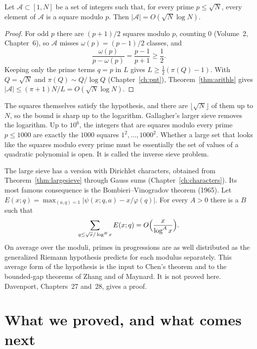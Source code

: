 \begin{proposition}\label{prop:squares}
Let $\mathcal A\subset[1,N]$ be a set of integers such that, for every prime $p\le\sqrt N$, every element of $\mathcal A$ is a square modulo $p$. Then $|\mathcal A|=O(\sqrt N\log N)$.
\end{proposition}
\begin{proof}
For odd $p$ there are $(p+1)/2$ squares modulo $p$, counting $0$ (Volume~2, Chapter~6), so $\mathcal A$ misses $\omega(p)=(p-1)/2$ classes, and
\[
\frac{\omega(p)}{p-\omega(p)}=\frac{p-1}{p+1}\ge\frac12.
\]
Keeping only the prime terms $q=p$ in $L$ gives $L\ge\frac12(\pi(Q)-1)$. With $Q=\sqrt N$ and $\pi(Q)\sim Q/\log Q$ (Chapter~\ref{ch:pnt}), Theorem~\ref{thm:arithls} gives $|\mathcal A|\le(\pi+1)N/L=O(\sqrt N\log N)$.
\end{proof}

The squares themselves satisfy the hypothesis, and there are $\lfloor\sqrt N\rfloor$ of them up to $N$, so the bound is sharp up to the logarithm. Gallagher's larger sieve removes the logarithm. Up to $10^6$, the integers that are squares modulo every prime $p\le1000$ are exactly the $1000$ squares $1^2,\dots,1000^2$. Whether a large set that looks like the squares modulo every prime must be essentially the set of values of a quadratic polynomial is open. It is called the inverse sieve problem.

\begin{remark}\label{rem:bv}
The large sieve has a version with Dirichlet characters, obtained from Theorem~\ref{thm:largesieve} through Gauss sums (Chapter~\ref{ch:characters}). Its most famous consequence is the Bombieri--Vinogradov theorem (1965). Let $E(x;q)=\max_{(a,q)=1}\bigl|\psi(x;q,a)-x/\varphi(q)\bigr|$. For every $A>0$ there is a $B$ such that
\[
\sum_{q\le\sqrt x/\log^Bx}E(x;q)=O\Bigl(\frac x{\log^Ax}\Bigr).
\]
On average over the moduli, primes in progressions are as well distributed as the generalized Riemann hypothesis predicts for each modulus separately. This average form of the hypothesis is the input to Chen's theorem and to the bounded-gap theorems of Zhang and of Maynard. It is not proved here. Davenport, Chapters~27 and~28, gives a proof.
\end{remark}

\section{What we proved, and what comes next}

